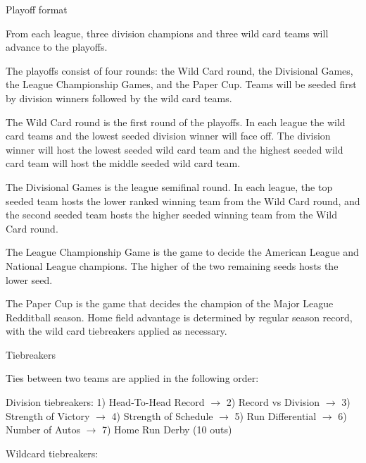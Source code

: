 \begin{deepEnumerate}
\begin{deepEnumerate}
\begin{deepEnumerate}
		\end{deepEnumerate}
		\item Playoff format
		\begin{deepEnumerate}
			\item From each league, three division champions and three wild card teams will advance to the playoffs.
			\item The playoffs consist of four rounds:
			the Wild Card round, the Divisional Games, the League Championship Games, and the Paper Cup.
			Teams will be seeded first by division winners followed by the wild card teams.
			\begin{deepEnumerate}
				\item The Wild Card round is the first round of the playoffs. 
				In each league the wild card teams and the lowest seeded division winner will face off. 
				The division winner will host the lowest seeded wild card team 
				and the highest seeded wild card team will host the middle seeded wild card team.
				\item The Divisional Games is the league semifinal round. 
				In each league, the top seeded team hosts the lower ranked winning team from the Wild Card round, 
				and the second seeded team hosts the higher seeded winning team from the Wild Card round.
				\item The League Championship Game is the game to decide the American League and National League champions. 
				The higher of the two remaining seeds hosts the lower seed.
				\item The Paper Cup is the game that decides the champion of the Major League Redditball season. 
				Home field advantage is determined by regular season record, 
				with the wild card tiebreakers applied as necessary.
			\end{deepEnumerate}
			\item Tiebreakers
			\begin{deepEnumerate}
				\item Ties between two teams are applied in the following order:
				\begin{deepEnumerate}
					\item Division tiebreakers: 
					1) Head-To-Head Record $\rightarrow$  
					2) Record vs Division $\rightarrow$ 
					3) Strength of Victory $\rightarrow$ 
					4) Strength of Schedule $\rightarrow$ 
					5) Run Differential $\rightarrow$  
					6) Number of Autos $\rightarrow$ 
					7) Home Run Derby (10 outs)
					\item Wildcard tiebreakers: 

\end{deepEnumerate}
\end{deepEnumerate}
\end{deepEnumerate}
\end{deepEnumerate}
\end{deepEnumerate}
